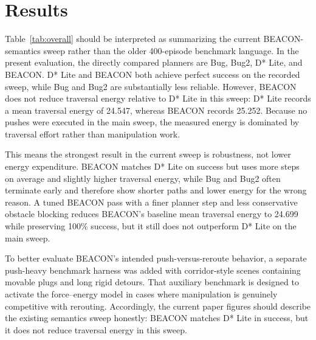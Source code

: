 \section{Results}

Table~\ref{tab:overall} should be interpreted as summarizing the current BEACON-semantics sweep rather than the older 400-episode benchmark language. In the present evaluation, the directly compared planners are Bug, Bug2, D* Lite, and BEACON. D* Lite and BEACON both achieve perfect success on the recorded sweep, while Bug and Bug2 are substantially less reliable. However, BEACON does not reduce traversal energy relative to D* Lite in this sweep: D* Lite records a mean traversal energy of 24.547, whereas BEACON records 25.252. Because no pushes were executed in the main sweep, the measured energy is dominated by traversal effort rather than manipulation work.

This means the strongest result in the current sweep is robustness, not lower energy expenditure. BEACON matches D* Lite on success but uses more steps on average and slightly higher traversal energy, while Bug and Bug2 often terminate early and therefore show shorter paths and lower energy for the wrong reason. A tuned BEACON pass with a finer planner step and less conservative obstacle blocking reduces BEACON's baseline mean traversal energy to 24.699 while preserving 100\% success, but it still does not outperform D* Lite on the main sweep.

To better evaluate BEACON's intended push-versus-reroute behavior, a separate push-heavy benchmark harness was added with corridor-style scenes containing movable plugs and long rigid detours. That auxiliary benchmark is designed to activate the force--energy model in cases where manipulation is genuinely competitive with rerouting. Accordingly, the current paper figures should describe the existing semantics sweep honestly: BEACON matches D* Lite in success, but it does not reduce traversal energy in this sweep.
